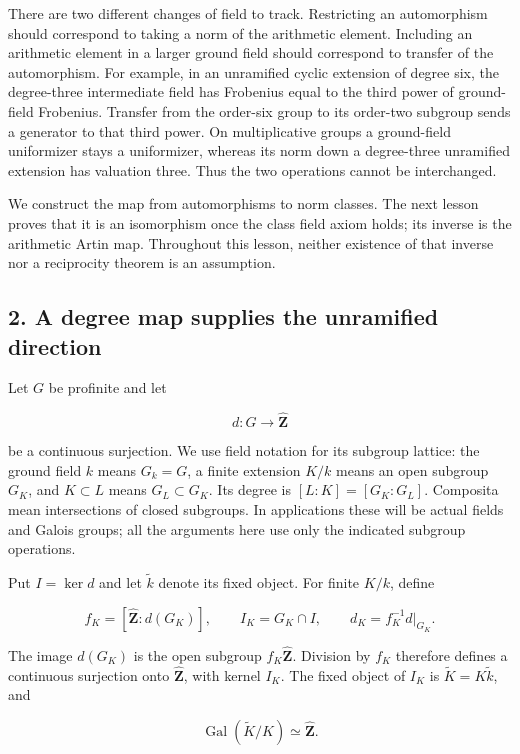 \documentclass[11pt,a4paper]{article}
\begin{document}
There are two different changes of field to track. Restricting an
automorphism should correspond to taking a norm of the arithmetic
element. Including an arithmetic element in a larger ground field should
correspond to transfer of the automorphism. For example, in an
unramified cyclic extension of degree six, the degree-three intermediate
field has Frobenius equal to the third power of ground-field Frobenius.
Transfer from the order-six group to its order-two subgroup sends a
generator to that third power. On multiplicative groups a ground-field
uniformizer stays a uniformizer, whereas its norm down a degree-three
unramified extension has valuation three. Thus the two operations cannot
be interchanged.

We construct the map from automorphisms to norm classes. The next lesson
proves that it is an isomorphism once the class field axiom holds; its
inverse is the arithmetic Artin map. Throughout this lesson, neither
existence of that inverse nor a reciprocity theorem is an assumption.

\subsection{2. A degree map supplies the unramified
direction}\label{a-degree-map-supplies-the-unramified-direction}

Let \(G\) be profinite and let

\[
d:G\longrightarrow\widehat{\mathbf Z}
\]

be a continuous surjection. We use field notation for its subgroup
lattice: the ground field \(k\) means \(G_k=G\), a finite extension
\(K/k\) means an open subgroup \(G_K\), and \(K\subset L\) means
\(G_L\subset G_K\). Its degree is \([L:K]=[G_K:G_L]\). Composita mean
intersections of closed subgroups. In applications these will be actual
fields and Galois groups; all the arguments here use only the indicated
subgroup operations.

Put \(I=\ker d\) and let \(\widetilde k\) denote its fixed object. For
finite \(K/k\), define

\[
f_K=[\widehat{\mathbf Z}:d(G_K)],\qquad
I_K=G_K\cap I,\qquad
d_K=f_K^{-1}d|_{G_K}.
\]

The image \(d(G_K)\) is the open subgroup \(f_K\widehat{\mathbf Z}\).
Division by \(f_K\) therefore defines a continuous surjection onto
\(\widehat{\mathbf Z}\), with kernel \(I_K\). The fixed object of
\(I_K\) is \(\widetilde K=K\widetilde k\), and

\[
\operatorname{Gal}(\widetilde K/K)\simeq\widehat{\mathbf Z}.
\]
\end{document}
